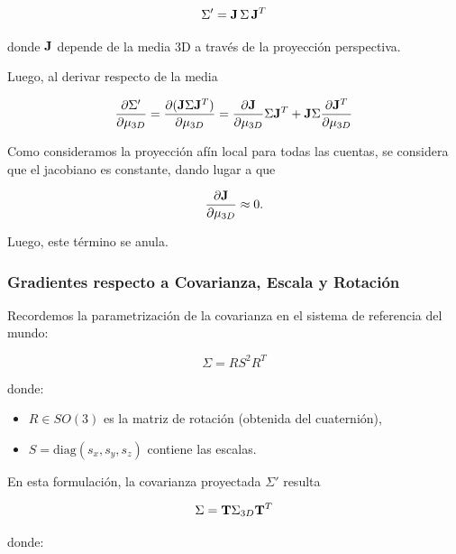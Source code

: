 \begin{equation}
    \Sigma' = \mathbf{J} \, \Sigma \, \mathbf{J}^T
\end{equation}

\noindent donde $\mathbf{J}$ depende de la media 3D a través de la proyección perspectiva.

Luego, al derivar respecto de la media

\begin{equation}
    \frac{\partial \Sigma'}{\partial \mu_{3D}} = 
    \frac{\partial (\mathbf{J} \Sigma \mathbf{J}^T)}{\partial \mu_{3D}} =
    \frac{\partial \mathbf{J}}{\partial \mu_{3D}} \Sigma \mathbf{J} ^T 
    + \mathbf{J} \Sigma \frac{\partial \mathbf{J}^T}{\partial \mu_{3D}}
\end{equation}

Como consideramos la proyección afín local para todas las cuentas, se considera que el jacobiano es constante, dando lugar a que

\begin{equation}
    \frac{\partial \mathbf{J}}{\partial \mu_{3D}} \approx 0.
\end{equation}

Luego, este término se anula.



\subsubsection{Gradientes respecto a Covarianza, Escala y Rotación}

Recordemos la parametrización de la covarianza en el sistema de referencia del mundo:

\begin{equation}
\Sigma = R S^2 R^T
\end{equation}

\noindent donde:
\begin{itemize}
    \item $R \in SO(3)$ es la matriz de rotación (obtenida del cuaternión),
    \item $S = \mathrm{diag}(s_x, s_y, s_z)$ contiene las escalas.
\end{itemize}

En esta formulación, la covarianza proyectada $\Sigma'$ resulta

\begin{equation}
\Sigma = \mathbf{T} \Sigma_{3D} \mathbf{T}^T
\end{equation}

\noindent donde:

